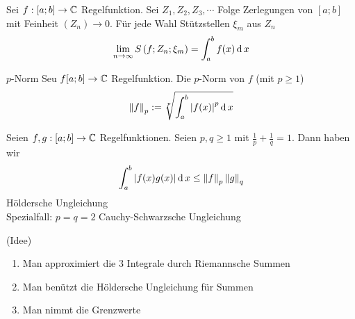 \begin{Kor}
  Sei $f:[a;b]\to\mathbb{C}$ Regelfunktion. Sei $Z_1,Z_2,Z_3,\cdots$ Folge Zerlegungen von $[a;b]$ mit Feinheit $(Z_n)\to 0$. Für jede Wahl Stützstellen $\xi_m$ aus $Z_n$
  \[\displaystyle\lim_{n\rightarrow\infty}S\left( f;Z_n;\xi_m \right)=\int^b_af(x)\operatorname{d} x\]
\end{Kor}
\begin{Def}{$p$-Norm}
  Seu $f[a;b]\to\mathbb{C}$ Regelfunktion. Die $p$-Norm von $f$ (mit $p\geq 1$)
  \[\left\| f \right\|_p:=\sqrt[p]{\int^b_a\left| f(x) \right|^p\operatorname{d} x}\]
\end{Def}
\begin{Sat}
  Seien $f,g:[a;b]\to\mathbb{C}$ Regelfunktionen. Seien $p,q\geq 1$ mit $\frac{1}{p}+\frac{1}{q}=1$. Dann haben wir
  \[\int_a^b\left| f(x)g(x) \right|\operatorname{d} x\leq \left\| f \right\|_p\left\| g \right\|_q\]
  Höldersche Ungleichung\\
  Spezialfall: $p=q=2$ Cauchy-Schwarzsche Ungleichung
\end{Sat}
\begin{Bew}
  (Idee)
  \begin{enumerate}
    \item Man approximiert die 3 Integrale durch Riemannsche Summen
    \item Man benützt die Höldersche Ungleichung für Summen
    \item Man nimmt die Grenzwerte
  \end{enumerate}
\end{Bew}

